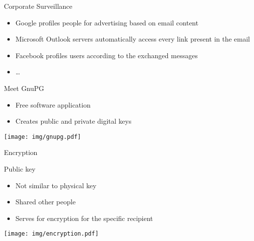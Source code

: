 \documentclass{beamer}
\begin{document}
\begin{frame}{Corporate Surveillance}
  \begin{itemize}
  \item Google profiles people for advertising based on email content
  \item Microsoft Outlook servers automatically access every link present in the email
  \item Facebook profiles users according to the exchanged messages
  \item \dots
  \end{itemize}
\end{frame}



\begin{frame}{Meet GnuPG}
  \begin{minipage}{0.69\linewidth}

    \begin{itemize}
    \item Free software application
    \item Creates public and private digital keys
    \end{itemize}
  \end{minipage}
%
  \begin{minipage}{0.29\linewidth}
    \texttt{[image: img/gnupg.pdf]}
  \end{minipage}
  
\end{frame}

\begin{frame}{Encryption}
  \begin{minipage}{0.69\linewidth}
    Public key
    \begin{itemize}
    \item Not similar to physical key
    \item Shared other people
    \item Serves for encryption for the specific recipient
    \end{itemize}
  \end{minipage}
%
  \begin{minipage}{0.29\linewidth}
    \texttt{[image: img/encryption.pdf]}
  \end{minipage}
\end{frame}
\end{document}
